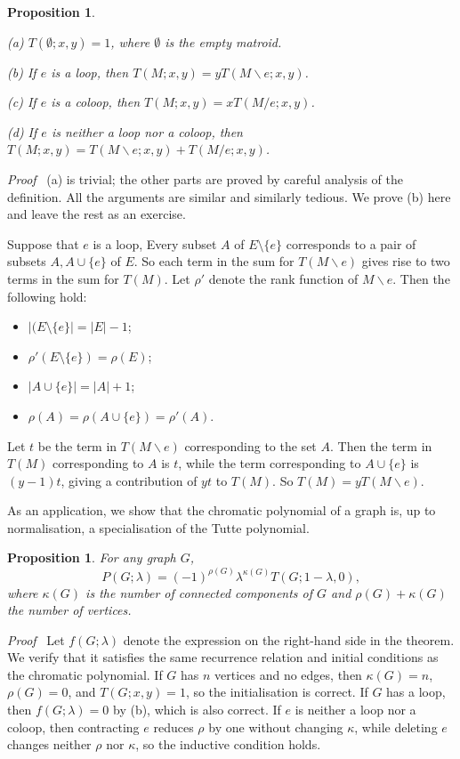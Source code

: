 \documentclass[12pt]{article}
\newtheorem{proposition}[theorem]{Proposition}
\newcommand{\head}[1]{\medbreak\noindent\textit{#1}\ }
\begin{document}
\begin{proposition}
\begin{description}
\item{(a)} $T(\emptyset;x,y)=1$, where $\emptyset$ is the empty matroid.
\item{(b)} If $e$ is a loop, then $T(M;x,y)=yT(M\backslash e;x,y)$.
\item{(c)} If $e$ is a coloop, then $T(M;x,y)=xT(M/e;x,y)$.
\item{(d)} If $e$ is neither a loop nor a coloop, then $T(M;x,y)=
T(M\backslash e;x,y)+T(M/e;x,y)$.
\end{description}
\end{proposition}

\head{Proof} (a) is trivial; the other parts are proved by careful analysis
of the definition. All the arguments are similar and similarly tedious.
We prove (b) here and leave the rest as an exercise.

Suppose that $e$ is a loop, Every subset $A$ of $E\setminus\{e\}$ corresponds
to a pair of subsets $A,A\cup\{e\}$ of $E$. So each term in the sum for
$T(M\backslash e)$ gives rise to two terms in the sum for $T(M)$. Let
$\rho'$ denote the rank function of $M\backslash e$. Then the following
hold:
\begin{itemize}
\item $|(E\setminus\{e\}|=|E|-1$;
\item $\rho'(E\setminus\{e\})=\rho(E)$;
\item $|A\cup\{e\}|=|A|+1$;
\item $\rho(A)=\rho(A\cup\{e\})=\rho'(A)$.
\end{itemize}
Let $t$ be the term in $T(M\backslash e)$ corresponding to the set $A$.
Then the term in $T(M)$ corresponding to $A$ is $t$, while the term
corresponding to $A\cup\{e\}$ is $(y-1)t$, giving a contribution of $yt$
to $T(M)$. So $T(M)=yT(M\backslash e)$.

\medbreak

As an application, we show that the chromatic polynomial of a
graph is, up to normalisation, a specialisation of the Tutte
polynomial.

\begin{proposition}
For any graph $G$,
\[P(G;\lambda)=(-1)^{\rho(G)}\lambda^{\kappa(G)}T(G;1-\lambda,0),\]
where $\kappa(G)$ is the number of connected components of $G$ and
$\rho(G)+\kappa(G)$ the number of vertices.
\end{proposition}


\head{Proof} Let $f(G;\lambda)$ denote the expression on the
right-hand side in the theorem. We verify that it satisfies the
same recurrence relation and initial conditions as the chromatic
polynomial. If $G$ has $n$ vertices and no edges, then $\kappa(G)=n$,
$\rho(G)=0$, and $T(G;x,y)=1$, so the initialisation is correct.
If $G$ has a loop, then $f(G;\lambda)=0$ by (b), which is also
correct. If $e$ is neither a loop nor a coloop, then contracting
$e$ reduces $\rho$ by one without changing $\kappa$, while
deleting $e$ changes neither $\rho$ nor $\kappa$, so the inductive
condition holds.
\end{document}
